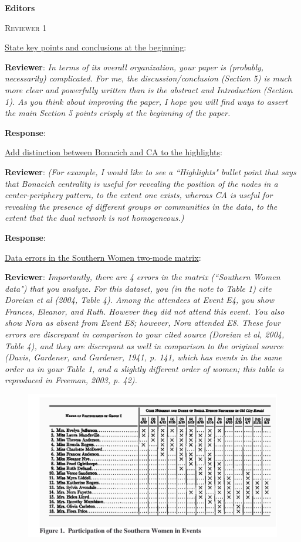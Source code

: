 \documentclass{article}
\begin{document}
\textbf{Editors}

\textsc{Reviewer 1}

\underline{State key points and conclusions at the beginning}:

\textbf{Reviewer}: \textit{In terms of its overall organization, your paper is (probably, necessarily) complicated. For me, the discussion/conclusion (Section 5) is much more clear and powerfully written than is the abstract and Introduction (Section 1). As you think about improving the paper, I hope you will find ways to assert the main Section 5 points crisply at the beginning of the paper.} 

\textbf{Response}: 

\underline{Add distinction between Bonacich and CA to the highlights}:

\textbf{Reviewer}: \textit{(For example, I would like to see a ``Highlights" bullet point that says that Bonacich centrality is useful for revealing the position of the nodes in a center-periphery pattern, to the extent one exists, whereas CA is useful for revealing the presence of different groups or communities in the data, to the extent that the dual network is not homogeneous.)}

\textbf{Response}:

\underline{Data errors in the Southern Women two-mode matrix}:

\textbf{Reviewer}: \textit{Importantly, there are 4 errors in the matrix (``Southern Women data") that you analyze. For this dataset, you (in the note to Table 1) cite Doreian et al (2004, Table 4). Among the attendees at Event E4, you show Frances, Eleanor, and Ruth. However they did not attend this event. You also show Nora as absent from Event E8; however, Nora attended E8. These four errors are discrepant in comparison to your cited source (Doreian et al, 2004, Table 4), and they are discrepant as well in comparison to the original source (Davis, Gardener, and Gardener, 1941, p. 141, which has events in the same order as in your Table 1, and a slightly different order of women; this table is reproduced in Freeman, 2003, p. 42).}

\begin{figure}[h!]
    \includegraphics[width=1.0\textwidth]{Reviews and Response/sw-original.png}
\end{figure}
\end{document}
